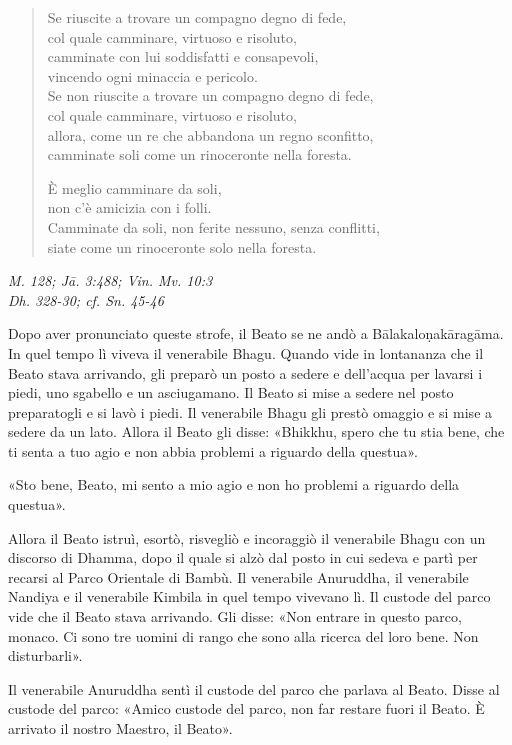 \begin{quote}
Se riuscite a trovare un compagno degno di fede, \\
col quale camminare, virtuoso e risoluto, \\
camminate con lui soddisfatti e consapevoli, \\
vincendo ogni minaccia e pericolo. \\
Se non riuscite a trovare un compagno degno di fede, \\
col quale camminare, virtuoso e risoluto, \\
allora, come un re che abbandona un regno sconfitto, \\
camminate soli come un rinoceronte nella foresta.


È meglio camminare da soli, \\
non c’è amicizia con i folli. \\
Camminate da soli, non ferite nessuno, senza conflitti, \\
siate come un rinoceronte solo nella foresta.
\end{quote}

\emph{M. 128; Jā. 3:488; Vin. Mv. 10:3} \\
\emph{Dh. 328-30; cf. Sn. 45-46}


Dopo aver pronunciato queste strofe, il Beato se ne andò a
Bālakaloṇakāragāma. In quel tempo lì viveva il venerabile Bhagu. Quando
vide in lontananza che il Beato stava arrivando, gli preparò un posto a
sedere e dell’acqua per lavarsi i piedi, uno sgabello e un asciugamano.
Il Beato si mise a sedere nel posto preparatogli e si lavò i piedi. Il
venerabile Bhagu gli prestò omaggio e si mise a sedere da un lato.
Allora il Beato gli disse: «Bhikkhu, spero che tu stia bene, che ti
senta a tuo agio e non abbia problemi a riguardo della questua».


«Sto bene, Beato, mi sento a mio agio e non ho problemi a riguardo della
questua».


Allora il Beato istruì, esortò, risvegliò e incoraggiò il venerabile
Bhagu con un discorso di Dhamma, dopo il quale si alzò dal posto in cui
sedeva e partì per recarsi al Parco Orientale di Bambù. Il venerabile
Anuruddha, il venerabile Nandiya e il venerabile Kimbila in quel tempo
vivevano lì. Il custode del parco vide che il Beato stava arrivando. Gli
disse: «Non entrare in questo parco, monaco. Ci sono tre uomini di rango
che sono alla ricerca del loro bene. Non disturbarli».


Il venerabile Anuruddha sentì il custode del parco che parlava al Beato.
Disse al custode del parco: «Amico custode del parco, non far restare
fuori il Beato. È arrivato il nostro Maestro, il Beato».


